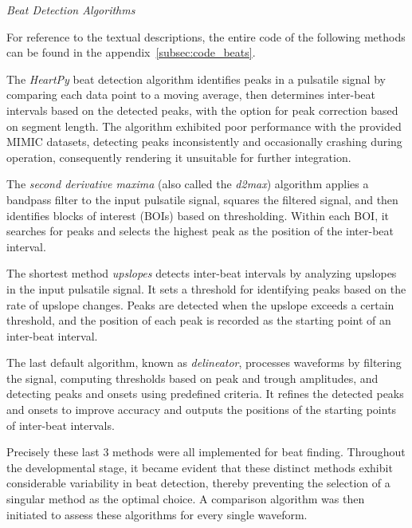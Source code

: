 \vspace{0.2cm}
\textit{Beat Detection Algorithms}
\vspace{0.2cm}

For reference to the textual descriptions, the entire code of the following methods can be found in the appendix~\ref{subsec:code_beats}.

The \textit{HeartPy} beat detection algorithm identifies peaks in a pulsatile signal by comparing each data point to a moving average,
then determines inter-beat intervals based on the detected peaks, with the option for peak correction based on segment length.
The algorithm exhibited poor performance with the provided MIMIC datasets, detecting peaks inconsistently and occasionally crashing during operation,
consequently rendering it unsuitable for further integration.

The \textit{second derivative maxima} (also called the \textit{d2max}) algorithm applies a bandpass filter to the input pulsatile signal,
squares the filtered signal, and then identifies blocks of interest (BOIs) based on thresholding.
Within each BOI, it searches for peaks and selects the highest peak as the position of the inter-beat interval.

The shortest method \textit{upslopes} detects inter-beat intervals by analyzing upslopes in the input pulsatile signal.
It sets a threshold for identifying peaks based on the rate of upslope changes.
Peaks are detected when the upslope exceeds a certain threshold, and the position of each peak is recorded as the starting point of an inter-beat interval.

The last default algorithm, known as \textit{delineator}, processes waveforms by filtering the signal, computing thresholds based on peak and trough amplitudes,
and detecting peaks and onsets using predefined criteria.
It refines the detected peaks and onsets to improve accuracy and outputs the positions of the starting points of inter-beat intervals.

Precisely these last 3 methods were all implemented for beat finding.
Throughout the developmental stage, it became evident that these distinct methods exhibit considerable variability in beat detection, thereby preventing the selection of a singular method as the optimal choice.
A comparison algorithm was then initiated to assess these algorithms for every single waveform.

